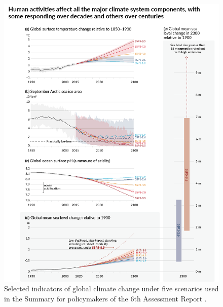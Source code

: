 \begin{figure}[hbtp]
    \centering
    \includegraphics[width=\textwidth]{images/intro/IPCC_AR6_WGI_SPM_Figure_8.png}
    \caption{Selected indicators of global climate change under five scenarios used in the Summary for policymakers of the 6th Assessment Report \citep{IPCC_2023}.}
    \label{fig:ipcc_ssp}
\end{figure}

\clearpage

